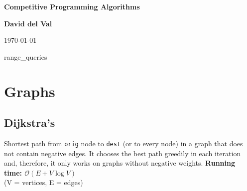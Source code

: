 \documentclass[12pt]{report}
\begin{document}
\begin{titlepage}
    \begin{center}
        \vspace*{1cm}
 
        \Huge
        \textbf{Competitive Programming Algorithms}
 

 
        \vspace{1.5cm}
 
		\Large
        \textbf{David del Val}
 
        \vfill
 
 
        \vspace{0.8cm}
 
 
        \Large
	\today
 
    \end{center}
\end{titlepage}

\setcounter{tocdepth}{2}
\tableofcontents 
{range_queries}
\chapter{Graphs}

\section{Dijkstra's}
Shortest path from \texttt{orig} node to \texttt{dest} (or to every node) in a graph
that does not contain negative edges. 
It chooses the best path greedily in each iteration and, therefore, it only works
on graphs without negative weights. 
\noindent \textbf{\boldmath Running time: $\mathcal{O}(E+V\log V)$}
\\ {\small(V = vertices, E = edges)}
\end{document}
